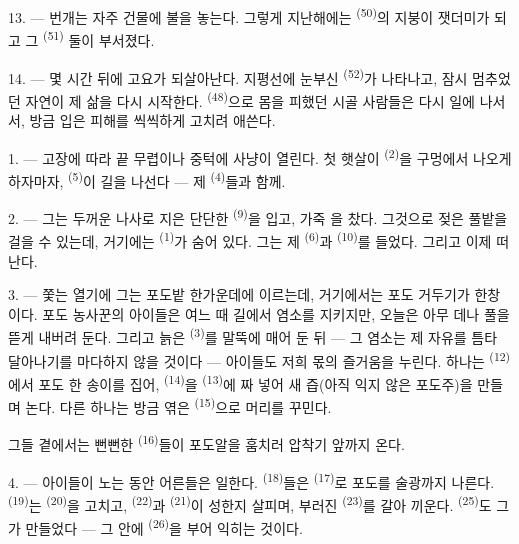 13. --- 번개는 자주 건물에 불을 놓는다. 그렇게 지난해에는 
\textsuperscript{(50)}의 지붕이 잿더미가 되고 그  \textsuperscript{(51)} 둘이
부서졌다.

14. --- 몇 시간 뒤에 고요가 되살아난다. 지평선에 눈부신 
\textsuperscript{(52)}가 나타나고, 잠시 멈추었던 자연이 제 삶을 다시 시작한다.
 \textsuperscript{(48)}으로 몸을 피했던 시골 사람들은 다시 일에 나서서,
방금 입은 피해를 씩씩하게 고치려 애쓴다.

\VUsaut{6.0mm}
\VUsaut{3.6mm}

\VUsaut{1.4mm}
\VUsaut{4.0mm}

1. --- 고장에 따라  끝 무렵이나  중턱에 사냥이 열린다. 첫
햇살이  \textsuperscript{(2)}을 구멍에서 나오게 하자마자, 
\textsuperscript{(5)}이 길을 나선다 — 제  \textsuperscript{(4)}들과 함께.

2. --- 그는 두꺼운 나사로 지은 단단한  \textsuperscript{(9)}을 입고, 가죽
을 찼다. 그것으로 젖은 풀밭을 걸을 수 있는데, 거기에는 
\textsuperscript{(1)}가 숨어 있다. 그는 제  \textsuperscript{(6)}과
 \textsuperscript{(10)}를 들었다. 그리고 이제 떠난다.

3. --- 쫓는 열기에 그는 포도밭 한가운데에 이르는데, 거기에서는 포도 거두기가 한창이다.
포도 농사꾼의 아이들은 여느 때 길에서 염소를 지키지만, 오늘은 아무 데나 풀을 뜯게
내버려 둔다. 그리고 늙은  \textsuperscript{(3)}를 말뚝에 매어 둔 뒤 — 그
염소는 제 자유를 틈타 달아나기를 마다하지 않을 것이다 — 아이들도 저희 몫의 즐거움을
누린다. 하나는  \textsuperscript{(12)}에서 포도 한 송이를 집어,
 \textsuperscript{(14)}을  \textsuperscript{(13)}에 짜 넣어 새 즙(아직
익지 않은 포도주)을 만들며 논다. 다른 하나는 방금 엮은 
\textsuperscript{(15)}으로 머리를 꾸민다.

그들 곁에서는 뻔뻔한  \textsuperscript{(16)}들이 포도알을 훔치러 압착기 앞까지
온다.

4. --- 아이들이 노는 동안 어른들은 일한다.  \textsuperscript{(18)}들은
 \textsuperscript{(17)}로 포도를 술광까지 나른다. 
\textsuperscript{(19)}는  \textsuperscript{(20)}을 고치고, 
\textsuperscript{(22)}과  \textsuperscript{(21)}이 성한지 살피며, 부러진
 \textsuperscript{(23)}를 갈아 끼운다.  \textsuperscript{(25)}도
그가 만들었다 — 그 안에  \textsuperscript{(26)}을 부어 익히는 것이다.

